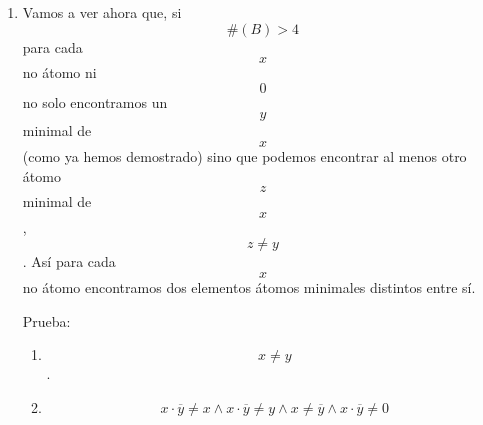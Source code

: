 \documentclass[
]{article}
\begin{document}
\begin{enumerate}
\begin{enumerate}
\begin{enumerate}
\begin{enumerate}
        \[1\] es el uno.
      \item
        \[\forall{z \in \left\lbrack {1,x} \right\rbrack_{B}}{{1 \cdot z} = z}\]

        Definimos un nuevo complementario.
      \item
        \[\forall{z \in \left\lbrack {1,x} \right\rbrack_{B}}{{z'} ≝ {x + \overline{z}}}\]

        Es interno.
      \item
        \[\forall{z \in \left\lbrack {1,x} \right\rbrack_{B}}{{z'} \geq x}\]
      \item
        \[\forall{z \in \left\lbrack {1,x} \right\rbrack_{B}}{{z'} \in \left\lbrack {1,x} \right\rbrack_{B}}\]

        Hace lo que tiene que hacer un complementario.
      \item
        \[\forall{z \in \left\lbrack {1,x} \right\rbrack_{B}}{{{{{{z'} \cdot z} = {{({x + \overline{z}})} \cdot z}} = {{({x \cdot z})} + {({\overline{z} \cdot z})}}} = {x \cdot z}} = x}\]
      \item
        \[\forall{z \in \left\lbrack {1,x} \right\rbrack_{B}}{{{{{z'} + z} = {{x + \overline{z}} + z}} = {x + 1}} = 1}\]

        Aplicamos la existencia de elementos hiperátomos y que \[x\] no
        lo es.
      \item
        \[{x \notin \mathit{Htom}}{(B)}\Rightarrow{\left( {1,x} \right)_{B} \neq \varnothing}\]
      \item
        \[\exists{y \in \mathit{Htom}}{(\left\lbrack {1,x} \right\rbrack_{B})}\]
      \item
        \[y \geq x\]
      \end{enumerate}
    \item
      Vamos a ver ahora que, si \[{\#{(B)}} > 4\] para cada \[x\] no
      átomo ni \[0\] no solo encontramos un \[y\] minimal de \[x\](como
      ya hemos demostrado) sino que podemos encontrar al menos otro
      átomo \[z\] minimal de \[x\], \[z \neq y\]. Así para cada \[x\] no
      átomo encontramos dos elementos átomos minimales distintos entre
      sí.

      Prueba:

      \begin{enumerate}
      \def\labelenumiv{\arabic{enumiv}.}
      \item
        \[x \neq y\].
      \item
        \[{{{{x \cdot \overline{y}} \neq {{x \land x} \cdot \overline{y}}} \neq {y \land x}} \neq {{\overline{y} \land x} \cdot \overline{y}}} \neq 0\]


\end{enumerate}
\end{enumerate}
\end{enumerate}
\end{enumerate}
\end{document}
